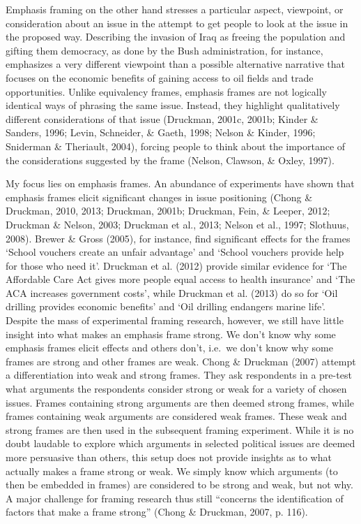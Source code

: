 \documentclass[12pt,econ]{sources/authesis}
\begin{document}
Emphasis framing on the other hand stresses a particular aspect, viewpoint, or consideration about an issue in the attempt to get people to look at the issue in the proposed way. Describing the invasion of Iraq as freeing the population and gifting them democracy, as done by the Bush administration, for instance, emphasizes a very different viewpoint than a possible alternative narrative that focuses on the economic benefits of gaining access to oil fields and trade opportunities. Unlike equivalency frames, emphasis frames are not logically identical ways of phrasing the same issue. Instead, they highlight qualitatively different considerations of that issue (Druckman, 2001c, 2001b; Kinder \& Sanders, 1996; Levin, Schneider, \& Gaeth, 1998; Nelson \& Kinder, 1996; Sniderman \& Theriault, 2004), forcing people to think about the importance of the considerations suggested by the frame (Nelson, Clawson, \& Oxley, 1997).

My focus lies on emphasis frames. An abundance of experiments have shown that emphasis frames elicit significant changes in issue positioning (Chong \& Druckman, 2010, 2013; Druckman, 2001b; Druckman, Fein, \& Leeper, 2012; Druckman \& Nelson, 2003; Druckman et al., 2013; Nelson et al., 1997; Slothuus, 2008). Brewer \& Gross (2005), for instance, find significant effects for the frames `School vouchers create an unfair advantage' and `School vouchers provide help for those who need it'. Druckman et al. (2012) provide similar evidence for `The Affordable Care Act gives more people equal access to health insurance' and `The ACA increases government costs', while Druckman et al. (2013) do so for `Oil drilling provides economic benefits' and `Oil drilling endangers marine life'. Despite the mass of experimental framing research, however, we still have little insight into what makes an emphasis frame strong. We don't know why some emphasis frames elicit effects and others don't, i.e.~we don't know why some frames are strong and other frames are weak. Chong \& Druckman (2007) attempt a differentiation into weak and strong frames. They ask respondents in a pre-test what arguments the respondents consider strong or weak for a variety of chosen issues. Frames containing strong arguments are then deemed strong frames, while frames containing weak arguments are considered weak frames. These weak and strong frames are then used in the subsequent framing experiment. While it is no doubt laudable to explore which arguments in selected political issues are deemed more persuasive than others, this setup does not provide insights as to what actually makes a frame strong or weak. We simply know which arguments (to then be embedded in frames) are considered to be strong and weak, but not why. A major challenge for framing research thus still ``concerns the identification of factors that make a frame strong'' (Chong \& Druckman, 2007, p. 116).
\end{document}
